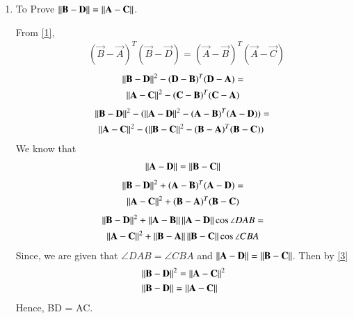 \begin{enumerate}
\item To Prove $\left\lVert\mathbf{B} - \mathbf{D}\right\rVert = \left\lVert\mathbf{A} - \mathbf{C}\right\rVert$. 

From \eqref{1},
\begin{align}
	& (\vec B -\vec A)^T(\vec{B}-\vec{D}) = (\vec A -\vec B)^T(\vec{A}-\vec{C})
\end{align}
\begin{multline}
\left\lVert\mathbf{B}-\mathbf{D}\right\rVert^2 - (\mathbf D -\mathbf B)^T(\mathbf{D}-\mathbf{A})= \\ \left\lVert\mathbf{A}-\mathbf{C}\right\rVert^2 - (\mathbf C -\mathbf B)^T(\mathbf{C}-\mathbf{A})	
\end{multline}
\begin{multline}
 \norm{\vec{B}-\vec{D}}^2 - (\norm{\vec{A}-\vec{D}}^2 - (\vec A -\vec B)^T(\vec A -\vec D))   = \\
 \norm{\vec{A}-\vec{C}}^2 - (\norm{\vec{B}-\vec{C}}^2 - (\vec B -\vec A)^T(\vec B -\vec C))\	
\end{multline}
We know that
\begin{align}
	\left\lVert\mathbf{A}-\mathbf{D}\right\rVert =  \left\lVert\mathbf{B}-\mathbf{C}\right\rVert 
\end{align}
\begin{multline}
\left\lVert\mathbf{B}-\mathbf{D}\right\rVert^2 + (\mathbf A -\mathbf B)^T(\mathbf{A}-\mathbf{D}) = \\ \left\lVert\mathbf{A}-\mathbf{C}\right\rVert^2 + (\mathbf B -\mathbf A)^T(\mathbf{B}-\mathbf{C}) 	
\end{multline}
\begin{multline}
\left\lVert\mathbf{B}-\mathbf{D}\right\rVert^2 + \left\lVert\mathbf{A}-\mathbf{B}\right\rVert\left\lVert\mathbf{A}-\mathbf{D}\right\rVert\cos \angle DAB = \\
 \left\lVert\mathbf{A}-\mathbf{C}\right\rVert^2 + \left\lVert\mathbf{B}-\mathbf{A}\right\rVert\left\lVert\mathbf{B}-\mathbf{C}\right\rVert\cos \angle CBA \label{3}	
\end{multline}
Since, we are given that $\angle DAB = \angle CBA$ and $\left\lVert\mathbf{A}-\mathbf{D}\right\rVert = \left\lVert\mathbf{B}-\mathbf{C}\right\rVert$. Then by \eqref{3}
\begin{align}
	& \left\lVert\mathbf{B}-\mathbf{D}\right\rVert^2 = \left\lVert\mathbf{A}-\mathbf{C}\right\rVert^2 \\
	& \label{4}\left\lVert\mathbf{B}-\mathbf{D}\right\rVert = \left\lVert\mathbf{A}-\mathbf{C}\right\rVert
\end{align}
Hence, BD = AC.
\end{enumerate}
